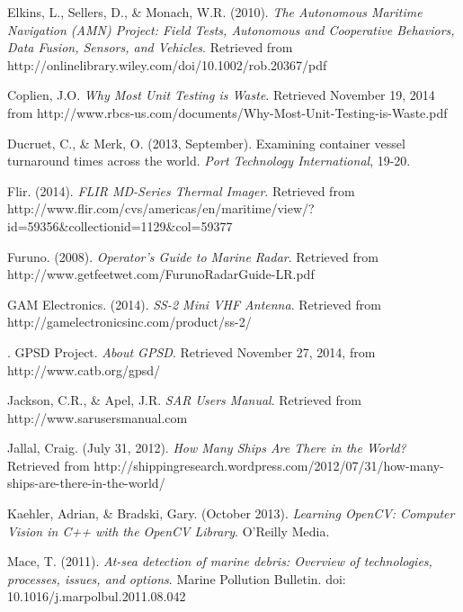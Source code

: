 \begin{thebibliography}{99}
\raggedright


 Elkins, L., Sellers, D., \& Monach, W.R. (2010). \textit{The Autonomous Maritime Navigation (AMN) Project: Field Tests, Autonomous and Cooperative Behaviors, Data Fusion, Sensors, and Vehicles}. Retrieved from http://onlinelibrary.wiley.com/doi/10.1002/rob.20367/pdf

 Coplien, J.O. \textit{Why Most Unit Testing is Waste}. Retrieved November 19, 2014 from http://www.rbcs-us.com/documents/Why-Most-Unit-Testing-is-Waste.pdf

 Ducruet, C., \& Merk, O. (2013, September). Examining container vessel turnaround times across the world. \textit{Port Technology International}, 19-20.

 Flir. (2014). \textit{FLIR MD-Series Thermal Imager}. Retrieved from http://www.flir.com/cvs/americas/en/maritime/view/?id=59356\&collectionid=1129\&col=59377

 Furuno. (2008). \textit{Operator's Guide to Marine Radar}. Retrieved from http://www.getfeetwet.com/FurunoRadarGuide-LR.pdf

 GAM Electronics. (2014). \textit{SS-2 Mini VHF Antenna}. Retrieved from http://gamelectronicsinc.com/product/ss-2/

. GPSD Project. \textit{About GPSD}. Retrieved November 27, 2014, from http://www.catb.org/gpsd/

 Jackson, C.R., \& Apel, J.R. \textit{SAR Users Manual}. Retrieved from http://www.sarusersmanual.com

 Jallal, Craig. (July 31, 2012). \textit{How Many Ships Are There in the World?} Retrieved from http://shippingresearch.wordpress.com/2012/07/31/how-many-ships-are-there-in-the-world/

 Kaehler, Adrian, \& Bradski, Gary. (October 2013). \textit{Learning OpenCV: Computer Vision in C++ with the OpenCV Library}. O'Reilly Media.

 Mace, T. (2011). \textit{At-sea detection of marine debris: Overview of technologies, processes, issues, and options}. Marine Pollution Bulletin. doi: 10.1016/j.marpolbul.2011.08.042


\end{thebibliography}
